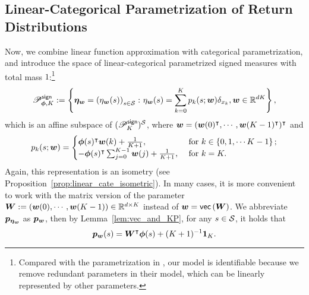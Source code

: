 \subsection{Linear-Categorical Parametrization of Return Distributions}\label{subsection:linear_cate_para}
Now, we combine linear function approximation with categorical parametrization, and introduce the space of linear-categorical parametrized signed measures with total mass $1$:\footnote{Compared with the parametrization in \citep[Section~9.6][]{bdr2022}, our model is identifiable because we remove redundant parameters in their model, which can be linearly represented by other parameters.}
\begin{equation*}
    {\mathscr{P}}^{\mathsf{sign}}_{{\bm{\phi}},K} := \left\{\bm{\eta}_{{\bm{w}}}=\left({\eta_{{\bm{w}}}(s)}\right)_{s\in{\mathcal{S}}}\colon \eta_{{\bm{w}}}(s)=\sum_{k=0}^Kp_k(s;{\bm{w}})\delta_{x_k},  {\bm{w}}\in{\mathbb R}^{dK} \right\},
\end{equation*}
which is an affine subspace of $({\mathscr{P}}^{\mathsf{sign}}_{K})^{{\mathcal{S}}}$, where ${\bm{w}}=({\bm{w}}(0)^{\intercal},\cdots,{\bm{w}}(K-1)^{\intercal})^{\intercal}$ and
\begin{equation}\label{eq:def_linear_parametrize}
            p_k(s;{\bm{w}})= \begin{cases} {\bm{\phi}}(s)^{\intercal}{\bm{w}}(k)+\frac{1}{K+1}, & \text{ for}\ k\in\left\{{0,1,\cdots K-1}\right\};\\
            -{\bm{\phi}}(s)^{\intercal}\sum_{j=0}^{K-1} {\bm{w}}(j)+\frac{1}{K+1}, & \text{ for}\ k=K.
            \end{cases}
\end{equation}
Again, this representation is an isometry (see Proposition~\ref{prop:linear_cate_isometric}).
In many cases, it is more convenient to work with the matrix version of the parameter ${\bm{W}}:=\left({{\bm{w}}(0),\cdots,{\bm{w}}(K-1)}\right)\in{\mathbb R}^{d\times K}$ instead of ${\bm{w}}=\mathsf{vec}\left({{\bm{W}}}\right)$.
We abbreviate ${\bm{p}}_{\bm{\eta}_{\bm{w}}}$ as ${\bm{p}}_{{\bm{w}}}$, then by Lemma~\ref{lem:vec_and_KP}, for any $s\in{\mathcal{S}}$, it holds that
\begin{equation}\label{eq:PMF_linear_parametrization}
    {\bm{p}}_{{\bm{w}}}(s)={\bm{W}}^{\intercal}{\bm{\phi}}(s)+(K+1)^{-1}\bm{1}_{K}.
\end{equation}
